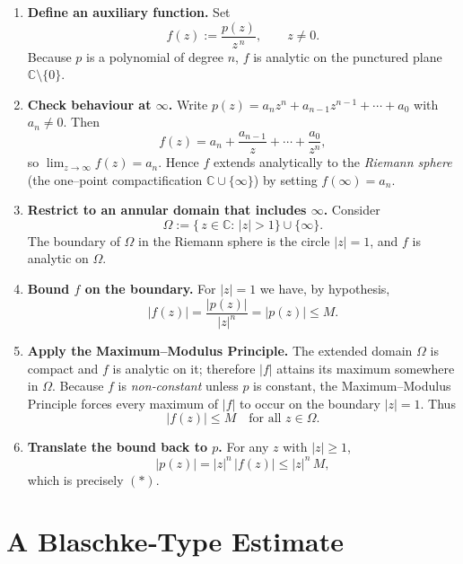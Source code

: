 \documentclass[12pt]{article}
\theoremstyle{definition} %
\theoremstyle{plain} %
\begin{document}
\begin{enumerate}
\item \textbf{Define an auxiliary function.}\;
      Set
      \[
          f(z):=\frac{p(z)}{z^{\,n}},\qquad z\neq0 .
      \]
      Because $p$ is a polynomial of degree $n$, $f$ is analytic on the
      punctured plane $\mathbb C\!\setminus\!\{0\}$.

\item \textbf{Check behaviour at $\infty$.}\;
      Write $p(z)=a_n z^{n}+a_{n-1}z^{n-1}+\cdots+a_0$ with $a_n\neq0$.
      Then
      \[
          f(z)=a_n + \frac{a_{n-1}}{z}+\cdots+\frac{a_0}{z^{n}} ,
      \]
      so $\displaystyle\lim_{z\to\infty}f(z)=a_n$.
      Hence $f$ extends analytically to the \emph{Riemann sphere}
      (the one--point compactification $\mathbb C\cup\{\infty\}$) by setting
      $f(\infty)=a_n$.

\item \textbf{Restrict to an annular domain that includes $\infty$.}\;
      Consider
      \[
          \Omega:=\bigl\{\,z\in\mathbb C:\,|z|>1\bigr\}\cup\{\infty\}.
      \]
      The boundary of $\Omega$ in the Riemann sphere is the circle
      $|z|=1$, and $f$ is analytic on $\Omega$.

\item \textbf{Bound $f$ on the boundary.}\;
      For $|z|=1$ we have, by hypothesis,
      \[
          |f(z)|=\frac{|p(z)|}{|z|^{n}} =|p(z)|\le M .
      \]

\item \textbf{Apply the Maximum--Modulus Principle.}\;
      The extended domain $\Omega$ is compact and $f$ is analytic on it;
      therefore $|f|$ attains its maximum somewhere in $\Omega$.
      Because $f$ is \emph{non‑constant} unless $p$ is constant, the
      Maximum--Modulus Principle forces every maximum of $|f|$ to occur
      on the boundary $|z|=1$.
      Thus
      \[
          |f(z)|\le M\quad\text{for all }z\in\Omega.
      \]

\item \textbf{Translate the bound back to $p$.}\;
      For any $z$ with $|z|\ge1$,
      \[
          |p(z)| = |z|^{n}\,|f(z)| \le |z|^{n}\,M ,
      \]
      which is precisely $(\ast)$.
\end{enumerate}

\section*{A Blaschke‐Type Estimate}
\end{document}
